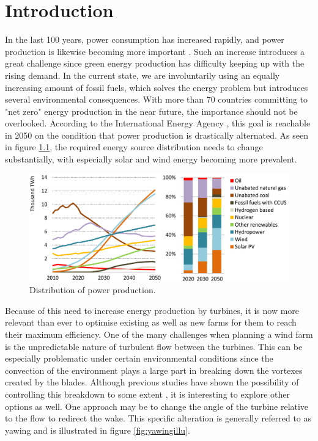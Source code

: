 \chapter{Introduction}
\label{chap:introduction}

In the last 100 years, power consumption has increased rapidly, and power production is likewise becoming more important \cite{powerconsumption}. Such an increase introduces a great challenge since green energy production has difficulty keeping up with the rising demand. In the current state, we are involuntarily using an equally increasing amount of fossil fuels, which solves the energy problem but introduces several environmental consequences. With more than 70 countries committing to "net zero" energy production in the near future, the importance should not be overlooked. According to the International Energy Agency \cite{powerconsumptiongraph}, this goal is reachable in 2050 on the condition that power production is drastically alternated. As seen in figure \ref{fig:powerdistribution}, the required energy source distribution needs to change substantially, with especially solar and wind energy becoming more prevalent.

\begin{figure}[H]
    \centering
    \includegraphics[scale=0.45]{Illustrations/Distribution of power production.png}
    \caption{Distribution of power production. \cite{powerconsumptiongraph}}
    \label{fig:powerdistribution}
\end{figure}

Because of this need to increase energy production by turbines, it is now more relevant than ever to optimise existing as well as new farms for them to reach their maximum efficiency. One of the many challenges when planning a wind farm is the unpredictable nature of turbulent flow between the turbines. This can be especially problematic under certain environmental conditions since the convection of the environment plays a large part in breaking down the vortexes created by the blades. Although previous studies have shown the possibility of controlling this breakdown to some extent \cite{wakebreakdown}, it is interesting to explore other options as well. One approach may be to change the angle of the turbine relative to the flow to redirect the wake. This specific alteration is generally referred to as yawing and is illustrated in figure \ref{fig:yawingillu}.

